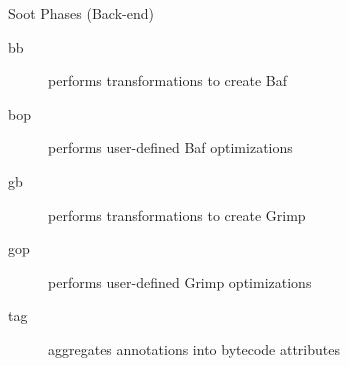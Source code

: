 \begin{slide}{Soot Phases (Back-end)}
\begin{description}
\item[bb] performs transformations to create Baf
\item[bop] performs user-defined Baf optimizations
\end{description}
\begin{description}
\item[gb] performs transformations to create Grimp
\item[gop] performs user-defined Grimp optimizations
\end{description}
\begin{description}
\item[tag] aggregates annotations into bytecode attributes
\end{description}
\end{slide}



